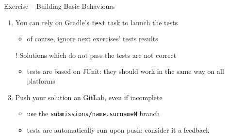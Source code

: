 \documentclass{beamer}\mode<presentation>{\usetheme{AMSCesenaPurpleAndGold}}
\begin{document}
\begin{frame}[c,allowframebreaks]{Exercise \currentExercise{} -- Building Basic Behaviours}
\begin{enumerate}
        \medskip

        \item You can rely on Gradle's \texttt{test} task to launch the tests
        \begin{itemize}
            \item of course, ignore next exercises' tests results
        \end{itemize}

        \medskip

        \item[!] Solutions which do not pass the tests are not correct
        \begin{itemize}
            \item tests are based on JUnit: they should work in the same way on all platforms
        \end{itemize}

        \medskip

        \item Push your solution on GitLab, \alert{even if incomplete}
        \begin{itemize}
            \item use the \texttt{submissions/\alert{name.surnameN}} branch
            \item tests are automatically run upon push: consider it a feedback
        \end{itemize}

    \end{enumerate}

\end{frame}


\section*{}
\frame{\titlepage}
\end{document}
